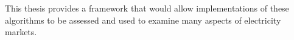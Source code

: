 This thesis provides a framework that would allow implementations of these
algorithms to be assessed and used to examine many aspects of electricity
markets.

%
%
%
%
